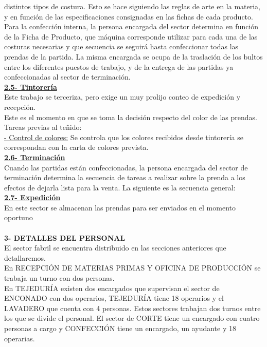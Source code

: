 \documentclass[a4paper,10pt,titlepage]{article}
\begin{document}
distintos tipos de costura. Esto se hace siguiendo las reglas de arte en la materia, y
en funci\'on de las especificaciones consignadas en las fichas de cada producto.
Para la confecci\'on interna, la persona encargada del sector determina en funci\'on
de la Ficha de Producto, que m\'aquina corresponde utilizar para cada una de las
costuras necesarias y que secuencia se seguir\'a hasta confeccionar todas las
prendas de la partida. La misma encargada se ocupa de la traslaci\'on de los bultos
entre los diferentes puestos de trabajo, y de la entrega de las partidas ya
confeccionadas al sector de terminaci\'on.\\
\textbf{\underline{2.5- Tintorer\'ia}}\\
Este trabajo se terceriza, pero exige un muy prolijo conteo de expedici\'on y
recepci\'on.\\
Este es el momento en que se toma la decisi\'on respecto del color de las prendas.\\
Tareas previas al teñido:\\
\underline{ - Control de colores:} Se controla que los colores recibidos desde tintorer\'ia se
correspondan con la carta de colores prevista.\\
\textbf{\underline{2.6- Terminaci\'on}}\\
Cuando las partidas est\'an confeccionadas, la persona encargada del sector de
terminaci\'on determina la secuencia de tareas a realizar sobre la prenda a los
efectos de dejarla lista para la venta. La siguiente es la secuencia general:\\
\textbf{\underline{2.7- Expedici\'on}}\\
En este sector se almacenan las prendas para ser enviados en el momento
oportuno\\ \\
\textbf{3- DETALLES DEL PERSONAL}\\
El sector fabril se encuentra distribuido en las secciones anteriores que
detallaremos.\\
En RECEPCIÓN DE MATERIAS PRIMAS Y OFICINA DE PRODUCCIÓN se
trabaja un turno con dos personas.\\
En TEJEDURÍA existen dos encargados que supervisan el sector de ENCONADO
con dos operarios, TEJEDURÍA tiene 18 operarios y el LAVADERO que cuenta con
4 personas. Estos sectores trabajan dos turnos entre los que se divide el personal.
El sector de CORTE tiene un encargado con cuatro personas a cargo y
CONFECCIÓN tiene un encargado, un ayudante y 18 operarias.\\
\end{document}
